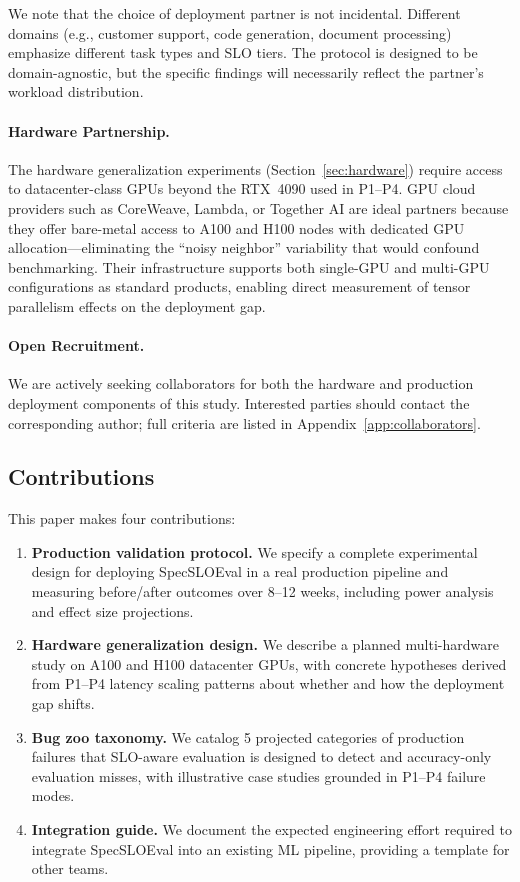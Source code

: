 \documentclass[11pt]{article}
\begin{document}
We note that the choice of deployment partner is not incidental. Different domains (e.g., customer support, code generation, document processing) emphasize different task types and SLO tiers. The protocol is designed to be domain-agnostic, but the specific findings will necessarily reflect the partner's workload distribution.

\paragraph{Hardware Partnership.} The hardware generalization experiments (Section~\ref{sec:hardware}) require access to datacenter-class GPUs beyond the RTX~4090 used in P1--P4. GPU cloud providers such as CoreWeave, Lambda, or Together AI are ideal partners because they offer bare-metal access to A100 and H100 nodes with dedicated GPU allocation---eliminating the ``noisy neighbor'' variability that would confound benchmarking. Their infrastructure supports both single-GPU and multi-GPU configurations as standard products, enabling direct measurement of tensor parallelism effects on the deployment gap.

\paragraph{Open Recruitment.} We are actively seeking collaborators for both the hardware and production deployment components of this study. Interested parties should contact the corresponding author; full criteria are listed in Appendix~\ref{app:collaborators}.

\subsection{Contributions}

This paper makes four contributions:

\begin{enumerate}[leftmargin=16pt]
    \item \textbf{Production validation protocol.} We specify a complete experimental design for deploying SpecSLOEval in a real production pipeline and measuring before/after outcomes over 8--12 weeks, including power analysis and effect size projections.
    \item \textbf{Hardware generalization design.} We describe a planned multi-hardware study on A100 and H100 datacenter GPUs, with concrete hypotheses derived from P1--P4 latency scaling patterns about whether and how the deployment gap shifts.
    \item \textbf{Bug zoo taxonomy.} We catalog 5 projected categories of production failures that SLO-aware evaluation is designed to detect and accuracy-only evaluation misses, with illustrative case studies grounded in P1--P4 failure modes.
    \item \textbf{Integration guide.} We document the expected engineering effort required to integrate SpecSLOEval into an existing ML pipeline, providing a template for other teams.
\end{enumerate}
\end{document}
